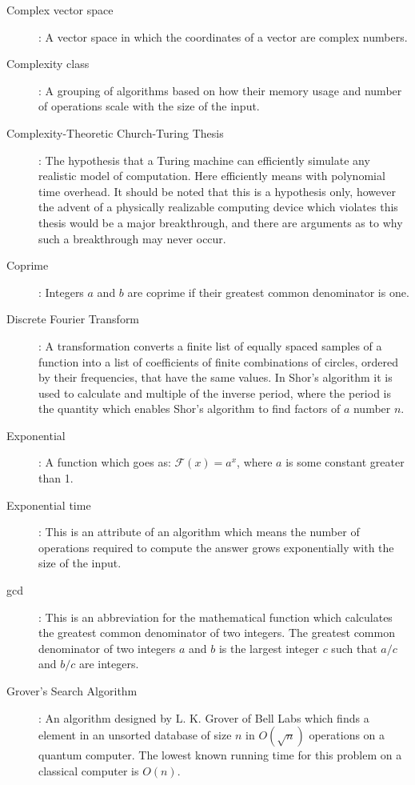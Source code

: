 \documentclass[]{article}
\begin{document}
\begin{description}
\item[Complex vector space]:
	A vector space in which the coordinates of a vector are
complex numbers.

\item[Complexity class]:
	A grouping of algorithms based on how their memory usage and
number of operations scale with the size of the input.

\item[Complexity-Theoretic Church-Turing Thesis]:
        The hypothesis that a Turing machine can efficiently simulate
        any realistic model of computation. Here efficiently means
        with polynomial time overhead.  It should be noted that this
        is a hypothesis only, however the advent of a physically
        realizable computing device which violates this thesis would
        be a major breakthrough, and there are arguments as to why
        such a breakthrough may never occur.

\item[Coprime]:
	Integers $a$ and $b$ are coprime if their greatest common
denominator is one.

\item[Discrete Fourier Transform]:
         A transformation converts a finite list of equally spaced
         samples of a function into a list of coefficients of finite
         combinations of circles, ordered by their frequencies, that
         have the same values. In Shor's algorithm it is used to
         calculate and multiple of the inverse period, where the
         period is the quantity which enables Shor's algorithm to find
         factors of $a$ number $n$.

\item[Exponential]:
	A function which goes as: $\mathcal{F}(x) = a^{x}$, where $a$
is some constant greater than 1.

\item[Exponential time]:
	This is an attribute of an algorithm which means the number of
operations required to compute the answer grows exponentially with the
size of the input.

\item[gcd]:
	This is an abbreviation for the mathematical function which
calculates the greatest common denominator of two integers.  The
greatest common denominator of two integers $a$ and $b$ is the largest
integer $c$ such that $a / c$ and $b / c$ are integers.

\item[Grover's Search Algorithm]:
	An algorithm designed by L. K. Grover of Bell Labs which finds
a element in an unsorted database of size $n$ in $O(\sqrt{n})$
operations on a quantum computer.  The lowest known running time for this problem on a classical computer is $O(n)$.


\end{description}
\end{document}
